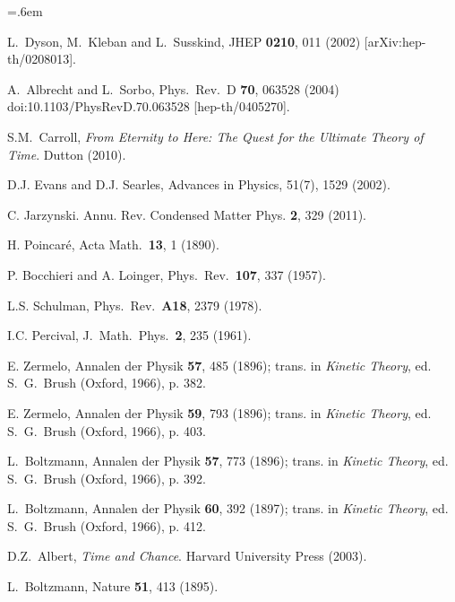 \documentclass[12pt,letterpaper]{article}
\begin{document}
\begin{thebibliography}{999}
\parindent=.6em

  L.~Dyson, M.~Kleban and L.~Susskind,
  JHEP {\bf 0210}, 011 (2002)
  [arXiv:hep-th/0208013].

  A.~Albrecht and L.~Sorbo,
  Phys.\ Rev.\ D {\bf 70}, 063528 (2004)
  doi:10.1103/PhysRevD.70.063528
  [hep-th/0405270].

  S.M.~Carroll,
  \emph{From Eternity to Here: The Quest for the Ultimate Theory of Time}. Dutton (2010).
  
D.J. Evans and D.J. Searles, Advances in Physics, 51(7), 1529 (2002).

C. Jarzynski. Annu. Rev. Condensed Matter Phys. {\bf 2}, 329 (2011).

H. Poincar\'e, Acta Math.\ {\bf 13}, 1 (1890).

 P. Bocchieri and A. Loinger,
Phys.\ Rev.\  {\bf 107}, 337 (1957).

L.S. Schulman,
 Phys.\ Rev.\  {\bf A18}, 2379 (1978).

I.C. Percival,
 J.\ Math.\ Phys.\  {\bf 2}, 235 (1961).
 
E. Zermelo, Annalen der Physik {\bf 57}, 485 (1896);
trans. in {\it Kinetic Theory}, ed. S.~G.~Brush
(Oxford, 1966), p. 382.
  
E. Zermelo, Annalen der Physik {\bf 59}, 793 (1896);
trans. in {\it Kinetic Theory}, ed. S.~G.~Brush
(Oxford, 1966), p. 403.
  
L.\ Boltzmann, Annalen der Physik {\bf 57}, 773 (1896);  
trans. in {\it Kinetic Theory}, ed. S.~G.~Brush
(Oxford, 1966), p. 392.

L.\ Boltzmann, Annalen der Physik {\bf 60}, 392 (1897);  
trans. in {\it Kinetic Theory}, ed. S.~G.~Brush
(Oxford, 1966), p. 412.

 D.Z.\ Albert, \emph{Time and Chance}. Harvard University Press (2003).

 L.~Boltzmann, Nature {\bf 51}, 413 (1895).
  

\end{thebibliography}
\end{document}

